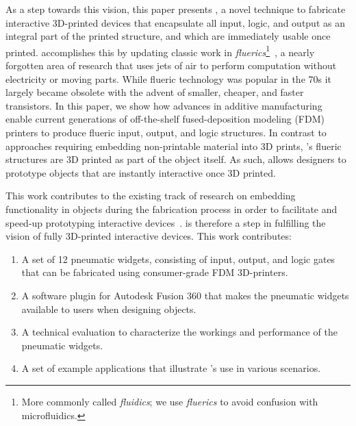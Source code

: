     As a step towards this vision, this paper presents \al, a novel
    technique to fabricate interactive 3D-printed devices that
    encapsulate all input, logic, and output as an integral part of
    the printed structure, and which are immediately usable once
    printed. \al accomplishes this by updating classic work in
    \textit{fluerics}\footnote{More commonly called
    \textit{fluidics}; we use \textit{fluerics} to avoid confusion
    with microfluidics.}~\cite{CharlesBelsterling:1971}, a nearly
    forgotten area of research that uses jets of air to perform
    computation without electricity or moving parts. While flueric
    technology was popular in the 70s
    it largely became obsolete with the advent of smaller, cheaper,
    and faster transistors. In this paper, we show how advances in
    additive manufacturing enable current generations of
    off-the-shelf fused-deposition modeling (FDM) printers to
    produce flueric input, output, and logic structures. In contrast
    to approaches requiring embedding non-printable material into 3D
    prints, \al's flueric structures are 3D printed as part of the
    object itself. As such, \al allows designers to prototype
    objects that are instantly interactive once 3D printed.
    
    This work contributes to the existing track of research on embedding
    functionality in objects during the fabrication process in order to
    facilitate and speed-up prototyping interactive
    devices~\cite{Valkeneers:2019, Ion:2017, Peng:2016}. \al
    is therefore a step in fulfilling the vision of fully 3D-printed
    interactive devices. This work contributes:

    \begin{enumerate}
      \item A set of 12 pneumatic widgets, consisting of input, output, and
        logic gates that can be fabricated using consumer-grade FDM
        3D-printers.
      \item A software plugin for Autodesk Fusion 360 that makes the
          pneumatic widgets available to users when designing
        \al objects.
      \item A technical evaluation to characterize the workings and
        performance of the pneumatic widgets.
      \item A set of example applications that illustrate \al's use
        in various scenarios.
    \end{enumerate}
    
